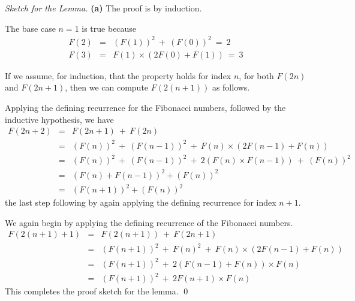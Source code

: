\begin{proof}[Sketch for the Lemma]
{\bf (a)} The proof is by induction.

\noindent
The base case $n=1$ is true because
\begin{eqnarray*}
F(2) & = & (F(1))^2 \ + \ (F(0))^2 \ = \ 2 \\
F(3) & = & F(1) \times (2F(0)+F(1)) \ = \ 3
\end{eqnarray*}

\medskip

If we assume, for induction, that the property holds for index $n$, for both $F(2n)$ and $F(2n+1)$, then we can compute $F(2(n+1))$ as follows.

\smallskip

Applying the defining recurrence for the Fibonacci numbers, followed by the inductive hypothesis, we have
\begin{eqnarray*}
F(2n+2) & = & F(2n+1) \ + \ F(2n) \\ 
              & = & (F(n))^2 \ + \ (F(n-1))^2 \ + \  F(n) \times (2 F(n-1) + F(n)) \\
              & = & (F(n))^2 \ + \ (F(n-1))^2 \ + \ 2 (F(n) \times F(n-1)) \ + \ (F(n))^2 \\
              & = & (F(n) + F(n-1))^2 + (F(n))^2 \\
              & = & (F(n+1))^2 + (F(n))^2
\end{eqnarray*}
the last step following by again applying the defining recurrence for index $n+1$.

\medskip 

We again begin by applying the defining recurrence of the Fibonacci numbers.
\begin{eqnarray*}
F(2(n+1)+1)  & = & F(2(n+1)) \ + \ F(2n+1) \\
                     & = & (F(n+1))^2 \ + \ F(n)^2 \ + \ F(n) \times (2 F(n-1) + F(n)) \\
                     & = & (F(n+1))^2 \ + \ 2 (F(n-1) + F(n)) \times F(n) \\
                     & = & (F(n+1))^2 \ + \ 2 F(n+1) \times F(n)
\end{eqnarray*}
This completes the proof sketch for the lemma.  \qed
\end{proof}
\smallskip

